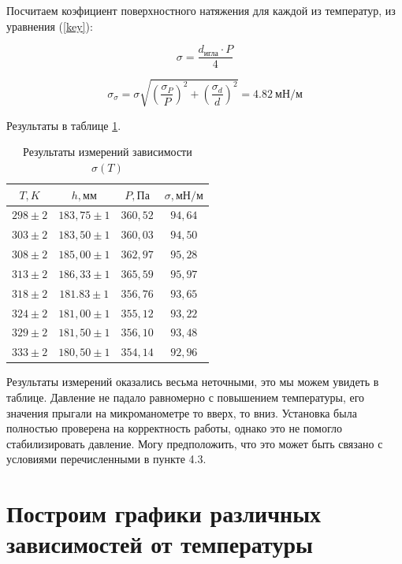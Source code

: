 \documentclass[a4paper,12pt]{article}
\begin{document}
			Посчитаем коэфициент поверхностного натяжения для каждой из температур, из уравнения (\ref{key}):

            \[
            \sigma = \frac{d_{\text{игла}} \cdot P}{4}
            \]
            
            \[
            \sigma_{\sigma} = \sigma \sqrt{\left( \frac{\sigma_P}{P} \right)^2 + \left( \frac{\sigma_d}{d} \right)^2} = 4.82 \ \text{мН/м}
            \]

			Результаты в таблице \ref{tab:sigma_T}.

			\begin{table}[!ht]
				\centering
				\begin{tabular}{|c|c|c|c|}
					\hline

					$T, K$ & $h, \text{мм}$ & $P, \text{Па}$ & $\sigma, \text{мН/м}$\\ \hline
					$298 \pm 2$ & $183,75 \pm 1$ & $360,52$  & $94,64 $\\ \hline
					  $303 \pm 2$ & $183,50 \pm 1$ & $360,03$  & $94,50 $\\ \hline
					  $308 \pm 2$ & $185,00 \pm 1$ & $362,97$  & $95,28 $\\ \hline
					  $313 \pm 2$ & $186,33 \pm 1$ & $365,59$  & $95,97 $\\ \hline
					  $318 \pm 2$ & $181.83 \pm 1$ & $356,76$  & $93,65 $\\ \hline
					  $324 \pm 2$ & $181,00 \pm 1$ & $355,12$  & $93,22 $\\ \hline
					$329 \pm 2$ & $181,50 \pm 1$ & $356,10$  & $93,48 $\\ \hline
					  $333 \pm 2$ & $180,50 \pm 1$ & $354,14$  & $92,96 $\\ \hline			
				\end{tabular}
				\caption{Результаты измерений зависимости $\sigma(T)$}
				\label{tab:sigma_T}
			\end{table}
                Результаты измерений оказались весьма неточными, это мы можем увидеть в таблице.
                Давление не падало равномерно с повышением температуры, его значения прыгали на микроманометре то вверх, то вниз. Установка была полностью проверена на корректность работы, однако это не помогло стабилизировать давление. Могу предположить, что это может быть связано с условиями перечисленными в пункте 4.3.

                \section{Построим графики различных зависимостей от температуры}
\end{document}
